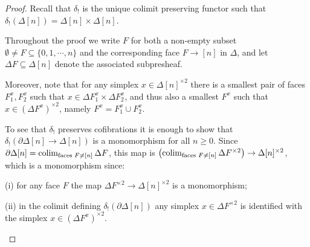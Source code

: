 \documentclass[a4paper,10pt
 ,draft
]{article}%
\begin{document}
\begin{proof}
	Recall that $\delta_!$ is the unique colimit preserving functor such that 
	$\delta_!(\Delta[n])=\Delta[n] \times \Delta[n]$.

Throughout the proof we write $F$ for both a non-empty subset $\emptyset \neq F \subseteq \{0,1,\cdots,n\}$ and the corresponding face $F \to [n]$ in $\Delta$, and let $\Delta F \subseteq \Delta[n]$ denote the associated subpresheaf. 


Moreover, note that for any simplex
$x \in \Delta[n]^{\times 2}$ there is a smallest pair of faces
$F_1^x, F_2^x$ such that
$x \in \Delta F_1^x \times \Delta F_2^x$, and thus also a smallest 
$F^x$ such that $x \in (\Delta F^x)^{\times 2}$,
namely $F^x = F^x_1 \cup F^x_2$.


	To see that $\delta_!$ preserves cofibrations 
	it is enough to show that 
	$\delta_{!}\left( \partial \Delta[n] \to \Delta[n]\right)$
	is a monomorphism for all $n\geq 0$.
	Since
	$\partial \Delta[n] = \mathop{\operatorname{colim}}_{\text{faces }F \neq [n]}\Delta F$, this map is
	$\left(\mathop{\operatorname{colim}}_{\text{faces }F \neq [n]}\Delta F^{\times 2}\right) \to \Delta[n]^{\times 2}$, which is a monomorphism since:
\begin{inparaenum}
	\item[(i)] for any face $F$ the map $\Delta F^{\times 2} \to \Delta[n]^{\times 2}$ is a monomorphism;
	\item[(ii)] in the colimit defining $\delta_{!} \left(\partial \Delta[n]\right)$ any simplex $x \in \Delta F^{\times 2}$ is identified with the simplex $x \in (\Delta F^x)^{\times 2}$.
\end{inparaenum}




\end{proof}
\end{document}
